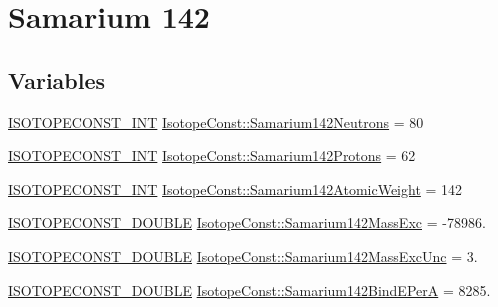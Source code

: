 \hypertarget{group___isotope_const-_samarium-_sm142}{}\section{Samarium 142}
\label{group___isotope_const-_samarium-_sm142}
\subsection*{Variables}
\begin{DoxyCompactItemize}
\item 
\mbox{\hyperlink{group___isotope_const-_macros_ga5f18360b3e99483a35c32d789e62621c}{I\+S\+O\+T\+O\+P\+E\+C\+O\+N\+S\+T\+\_\+\+I\+NT}} \mbox{\hyperlink{group___isotope_const-_samarium-_sm142_ga6c1a85868231613db36ff5c643c97d55}{Isotope\+Const\+::\+Samarium142\+Neutrons}} = 80
\item 
\mbox{\hyperlink{group___isotope_const-_macros_ga5f18360b3e99483a35c32d789e62621c}{I\+S\+O\+T\+O\+P\+E\+C\+O\+N\+S\+T\+\_\+\+I\+NT}} \mbox{\hyperlink{group___isotope_const-_samarium-_sm142_ga9c79a4fc04fceaa2c3eaccd34d45c1da}{Isotope\+Const\+::\+Samarium142\+Protons}} = 62
\item 
\mbox{\hyperlink{group___isotope_const-_macros_ga5f18360b3e99483a35c32d789e62621c}{I\+S\+O\+T\+O\+P\+E\+C\+O\+N\+S\+T\+\_\+\+I\+NT}} \mbox{\hyperlink{group___isotope_const-_samarium-_sm142_gacc6b9476e607a94a47002ca6979b9c96}{Isotope\+Const\+::\+Samarium142\+Atomic\+Weight}} = 142
\item 
\mbox{\hyperlink{group___isotope_const-_macros_ga8f45a7272ce02c0b4c65c44636ed719a}{I\+S\+O\+T\+O\+P\+E\+C\+O\+N\+S\+T\+\_\+\+D\+O\+U\+B\+LE}} \mbox{\hyperlink{group___isotope_const-_samarium-_sm142_ga207cb922df6c6ddd03f8671082100def}{Isotope\+Const\+::\+Samarium142\+Mass\+Exc}} = -\/78986.
\item 
\mbox{\hyperlink{group___isotope_const-_macros_ga8f45a7272ce02c0b4c65c44636ed719a}{I\+S\+O\+T\+O\+P\+E\+C\+O\+N\+S\+T\+\_\+\+D\+O\+U\+B\+LE}} \mbox{\hyperlink{group___isotope_const-_samarium-_sm142_gad6dfdca9fa38ca833ca8516e97925a64}{Isotope\+Const\+::\+Samarium142\+Mass\+Exc\+Unc}} = 3.
\item 
\mbox{\hyperlink{group___isotope_const-_macros_ga8f45a7272ce02c0b4c65c44636ed719a}{I\+S\+O\+T\+O\+P\+E\+C\+O\+N\+S\+T\+\_\+\+D\+O\+U\+B\+LE}} \mbox{\hyperlink{group___isotope_const-_samarium-_sm142_ga501bfde3ac5484c4cfee12f0d35a3e6f}{Isotope\+Const\+::\+Samarium142\+Bind\+E\+PerA}} = 8285.
\item 

\end{DoxyCompactItemize}
